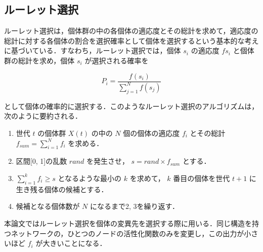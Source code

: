 \subsection{ルーレット選択}
ルーレット選択は，個体群の中の各個体の適応度とその総計を求めて，適応度の総計に対する各個体の割合を選択確率として個体を選択するという基本的な考えに基づいている\cite{遺伝的アルゴリズム}．すなわち，ルーレット選択では，個体 $ s_i $ の適応度 $ f{s_i} $ と個体群の総計を求め，個体 $ s_i $ が選択される確率を

\begin{equation}
    P_i = \frac{f(s_i)}{\sum^N_{j=1} f(s_j)}
\end{equation}

として個体の確率的に選択する．このようなルーレット選択のアルゴリズムは，次のように要約される．

\begin{enumerate}
    \item 世代 $ t $ の個体群 $ X(t) $ の中の $ N $ 個の個体の適応度 $ f_i $ とその総計 $ f_{sum} = \sum^N_{i=1} f_i $ を求める．

    \item 区間[0, 1]の乱数 $ rand $ を発生させ， $ s = rand \times f_{sum} $ とする．

    \item $ \sum^k_{i=1} f_i \geq s $ となるような最小の $ k $ を求めて， $ k $ 番目の個体を世代 $ t+1 $ に生き残る個体の候補とする．

    \item 候補となる個体数が $ N $ になるまで2, 3を繰り返す．
\end{enumerate}

本論文ではルーレット選択を個体の変異先を選択する際に用いる．同じ構造を持つネットワークの，ひとつのノードの活性化関数のみを変更し，この出力が小さいほど $ f_i $ が大きいことになる．
